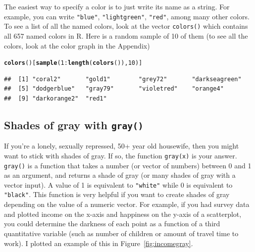\documentclass{tufte-book}\usepackage[]{graphicx}\usepackage[]{color}
\makeatletter
\newcommand{\hlnum}[1]{\textcolor[rgb]{0.686,0.059,0.569}{#1}}%
\newcommand{\hlopt}[1]{\textcolor[rgb]{0,0,0}{#1}}%
\newcommand{\hlstd}[1]{\textcolor[rgb]{0.345,0.345,0.345}{#1}}%
\newcommand{\hlkwd}[1]{\textcolor[rgb]{0.737,0.353,0.396}{\textbf{#1}}}%
\newenvironment{kframe}{%
 \def\at@end@of@kframe{}%
 \ifinner\ifhmode%
  \def\at@end@of@kframe{\end{minipage}}%
  \begin{minipage}{\columnwidth}%
 \fi\fi%
 \def\FrameCommand##1{\hskip\@totalleftmargin \hskip-\fboxsep
 \colorbox{shadecolor}{##1}\hskip-\fboxsep
     \hskip-\linewidth \hskip-\@totalleftmargin \hskip\columnwidth}%
 \MakeFramed {\advance\hsize-\width
   \@totalleftmargin\z@ \linewidth\hsize
   \@setminipage}}%
 {\par\unskip\endMakeFramed%
 \at@end@of@kframe}
\newenvironment{knitrout}{}{} %
\makeatother
\begin{document}
\begin{footnotesize}
The easiest way to specify a color is to just write its name as a string. For example, you can write \texttt{"blue"}, \texttt{"lightgreen"}, \texttt{"red"}, among many other colors. To see a list of all the named colors, look at the vector \texttt{colors()} which contains all 657 named colors in R. Here is a random sample of 10 of them (to see all the colors, look at the color graph in the Appendix)
  
\begin{footnotesize}
\begin{knitrout}
\color{fgcolor}\begin{kframe}
\begin{alltt}
\hlkwd{colors}\hlstd{()[}\hlkwd{sample}\hlstd{(}\hlnum{1}\hlopt{:}\hlkwd{length}\hlstd{(}\hlkwd{colors}\hlstd{()),} \hlnum{10}\hlstd{)]}
\end{alltt}
\begin{verbatim}
##  [1] "coral2"       "gold1"        "grey72"       "darkseagreen"
##  [5] "dodgerblue"   "gray79"       "violetred"    "orange4"     
##  [9] "darkorange2"  "red1"
\end{verbatim}
\end{kframe}
\end{knitrout}
\end{footnotesize}

\subsection{Shades of gray with \texttt{gray()}}
  
If you're a lonely, sexually repressed, 50+ year old housewife, then you might want to stick with shades of gray. If so, the function \texttt{gray(x)} is your answer. \texttt{gray()} is a function that takes a number (or vector of numbers) between 0 and 1 as an argument, and returns a shade of gray (or many shades of gray with a vector input). A value of 1 is equivalent to \texttt{"white"} while 0 is equivalent to \texttt{"black"}. This function is very helpful if you want to create shades of gray depending on the value of a numeric vector. For example, if you had survey data and plotted income on the x-axis and happiness on the y-axis of a scatterplot, you could determine the darkness of each point as a function of a third quantitative variable (such as number of children or amount of travel time to work). I plotted an example of this in Figure~\ref{fig:incomegray}.

\begin{marginfigure}


\end{marginfigure}
\end{footnotesize}
\end{document}
